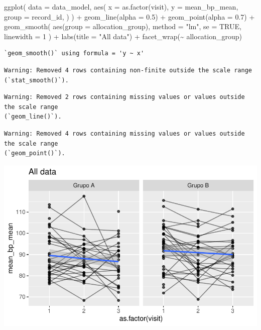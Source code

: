 \documentclass[
  letterpaper,
  DIV=11,
  numbers=noendperiod]{scrartcl}
\newenvironment{Shaded}{\begin{snugshade}}{\end{snugshade}}
\newcommand{\AttributeTok}[1]{\textcolor[rgb]{0.40,0.45,0.13}{#1}}
\newcommand{\ConstantTok}[1]{\textcolor[rgb]{0.56,0.35,0.01}{#1}}
\newcommand{\DecValTok}[1]{\textcolor[rgb]{0.68,0.00,0.00}{#1}}
\newcommand{\FloatTok}[1]{\textcolor[rgb]{0.68,0.00,0.00}{#1}}
\newcommand{\FunctionTok}[1]{\textcolor[rgb]{0.28,0.35,0.67}{#1}}
\newcommand{\NormalTok}[1]{\textcolor[rgb]{0.00,0.23,0.31}{#1}}
\newcommand{\SpecialCharTok}[1]{\textcolor[rgb]{0.37,0.37,0.37}{#1}}
\newcommand{\StringTok}[1]{\textcolor[rgb]{0.13,0.47,0.30}{#1}}
\begin{document}
\begin{Shaded}
\begin{Highlighting}[]
\FunctionTok{ggplot}\NormalTok{(}
    \AttributeTok{data =}\NormalTok{ data\_model, }
    \FunctionTok{aes}\NormalTok{(}
        \AttributeTok{x =} \FunctionTok{as.factor}\NormalTok{(visit),}
        \AttributeTok{y =}\NormalTok{ mean\_bp\_mean,}
        \AttributeTok{group =}\NormalTok{ record\_id,}
\NormalTok{    )}
\NormalTok{) }\SpecialCharTok{+}
    \FunctionTok{geom\_line}\NormalTok{(}\AttributeTok{alpha =} \FloatTok{0.5}\NormalTok{) }\SpecialCharTok{+}
    \FunctionTok{geom\_point}\NormalTok{(}\AttributeTok{alpha =} \FloatTok{0.7}\NormalTok{) }\SpecialCharTok{+}
    \FunctionTok{geom\_smooth}\NormalTok{(}
        \FunctionTok{aes}\NormalTok{(}\AttributeTok{group =}\NormalTok{ allocation\_group),}
        \AttributeTok{method =} \StringTok{"lm"}\NormalTok{,}
        \AttributeTok{se =} \ConstantTok{TRUE}\NormalTok{,}
        \AttributeTok{linewidth =} \DecValTok{1}
\NormalTok{    ) }\SpecialCharTok{+}
    \FunctionTok{labs}\NormalTok{(}\AttributeTok{title =} \StringTok{"All data"}\NormalTok{) }\SpecialCharTok{+}
    \FunctionTok{facet\_wrap}\NormalTok{(}\SpecialCharTok{\textasciitilde{}}\NormalTok{ allocation\_group) }
\end{Highlighting}
\end{Shaded}

\begin{verbatim}
`geom_smooth()` using formula = 'y ~ x'
\end{verbatim}

\begin{verbatim}
Warning: Removed 4 rows containing non-finite outside the scale range
(`stat_smooth()`).
\end{verbatim}

\begin{verbatim}
Warning: Removed 2 rows containing missing values or values outside the scale range
(`geom_line()`).
\end{verbatim}

\begin{verbatim}
Warning: Removed 4 rows containing missing values or values outside the scale range
(`geom_point()`).
\end{verbatim}

\includegraphics{Outcomes_V1V2V3_files/figure-pdf/mean_bp_mean_6-1.pdf}
\end{document}
